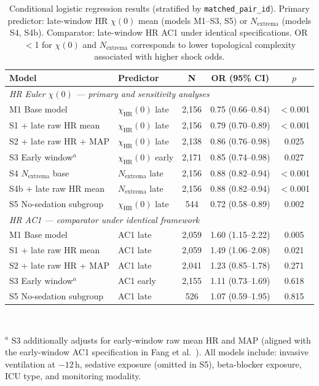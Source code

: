 \documentclass[12pt,a4paper]{article}
\begin{document}
\begin{table}[htbp]
\centering
\caption{Conditional logistic regression results (stratified by
\texttt{matched\_pair\_id}).
Primary predictor: late-window HR $\chi(0)$ mean (models M1--S3, S5)
or $N_{\text{extrema}}$ (models S4, S4b).
Comparator: late-window HR AC1 under identical specifications.
OR\,$<$1 for $\chi(0)$ and $N_{\text{extrema}}$ corresponds to lower
topological complexity associated with higher shock odds.}
\label{tab:logit}
\small
\begin{tabular}{llccc}
\toprule
\textbf{Model} & \textbf{Predictor} & \textbf{N} & \textbf{OR (95\% CI)} & \textbf{$p$} \\
\midrule
\multicolumn{5}{l}{\textit{HR Euler $\chi(0)$ — primary and sensitivity analyses}} \\
M1 Base model            & $\chi_{\text{HR}}(0)$ late       & 2,156 & 0.75 (0.66--0.84) & $<$0.001 \\
S1 + late raw HR mean    & $\chi_{\text{HR}}(0)$ late       & 2,156 & 0.79 (0.70--0.89) & $<$0.001 \\
S2 + late raw HR + MAP   & $\chi_{\text{HR}}(0)$ late       & 2,138 & 0.86 (0.76--0.98) & 0.025    \\
S3 Early window$^a$      & $\chi_{\text{HR}}(0)$ early      & 2,171 & 0.85 (0.74--0.98) & 0.027    \\
S4 $N_{\text{extrema}}$ base & $N_{\text{extrema}}$ late    & 2,156 & 0.88 (0.82--0.94) & $<$0.001 \\
S4b + late raw HR mean   & $N_{\text{extrema}}$ late        & 2,156 & 0.88 (0.82--0.94) & $<$0.001 \\
S5 No-sedation subgroup  & $\chi_{\text{HR}}(0)$ late       &   544 & 0.72 (0.58--0.89) & 0.002    \\
\midrule
\multicolumn{5}{l}{\textit{HR AC1 — comparator under identical framework}} \\
M1 Base model            & AC1 late           & 2,059 & 1.60 (1.15--2.22) & 0.005    \\
S1 + late raw HR mean    & AC1 late           & 2,059 & 1.49 (1.06--2.08) & 0.021    \\
S2 + late raw HR + MAP   & AC1 late           & 2,041 & 1.23 (0.85--1.78) & 0.271    \\
S3 Early window$^a$      & AC1 early          & 2,155 & 1.11 (0.73--1.69) & 0.618    \\
S5 No-sedation subgroup  & AC1 late           &   526 & 1.07 (0.59--1.95) & 0.815    \\
\bottomrule
\end{tabular}
\vspace{2pt}\\
\raggedright
\footnotesize $^a$ S3 additionally adjusts for early-window raw mean HR and MAP
(aligned with the early-window AC1 specification in Fang et al.\ \cite{fang2026}).
All models include: invasive ventilation at $-12$\,h, sedative exposure
(omitted in S5), beta-blocker exposure, ICU type, and monitoring modality.
\end{table}
\end{document}
